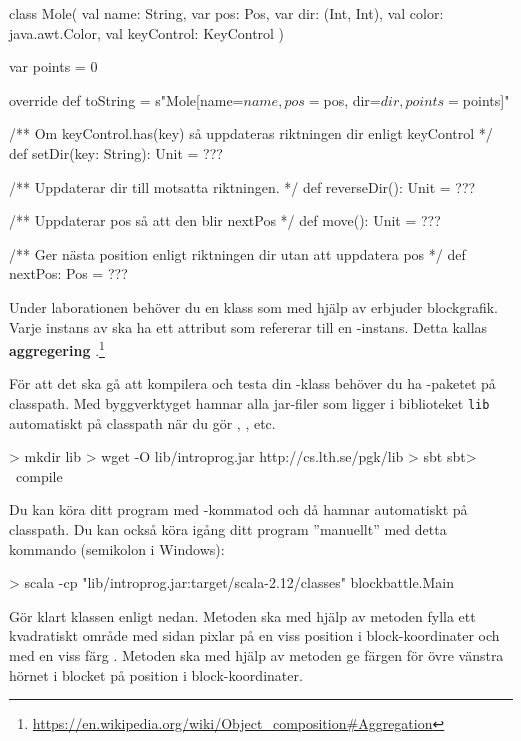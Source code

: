 \begin{CodeSmall}
class Mole(
  val name: String,
  var pos: Pos,
  var dir: (Int, Int),
  val color: java.awt.Color,
  val keyControl: KeyControl
){
  var points = 0

  override def toString =
    s"Mole[name=$name, pos=$pos, dir=$dir, points=$points]"

  /** Om keyControl.has(key) så uppdateras riktningen dir enligt keyControl */
  def setDir(key: String): Unit = ???

  /** Uppdaterar dir till motsatta riktningen. */
  def reverseDir(): Unit = ???

  /** Uppdaterar pos så att den blir nextPos */
  def move(): Unit = ???

  /** Ger nästa position enligt riktningen dir utan att uppdatera pos */
  def nextPos: Pos = ???
}
\end{CodeSmall}



\Subtask Under laborationen behöver du en klass  som med hjälp av  erbjuder blockgrafik. Varje instans av  ska ha ett attribut som refererar till en -instans. Detta kallas \textbf{aggregering} .\footnote{\url{https://en.wikipedia.org/wiki/Object\_composition\#Aggregation}}

För att det ska gå att kompilera och testa din -klass behöver du ha -paketet på classpath. Med byggverktyget  hamnar alla jar-filer som ligger i biblioteket \texttt{lib} automatiskt på classpath när du gör , , etc.

\begin{REPLnonum}
> mkdir lib
> wget -O lib/introprog.jar http://cs.lth.se/pgk/lib
> sbt
sbt> ~compile
\end{REPLnonum}
Du kan köra ditt program med -kommatod  och då hamnar  automatiskt på classpath. Du kan också köra igång ditt program ''manuellt'' med detta kommando (semikolon i Windows):
\begin{REPLnonum}
> scala -cp "lib/introprog.jar:target/scala-2.12/classes" blockbattle.Main
\end{REPLnonum}

Gör klart klassen  enligt nedan. Metoden  ska med hjälp av metoden  fylla ett kvadratiskt område med sidan  pixlar på en viss position  i block-koordinater och med en viss färg . Metoden  ska med hjälp av metoden  ge färgen för övre vänstra hörnet i blocket på position  i block-koordinater.

